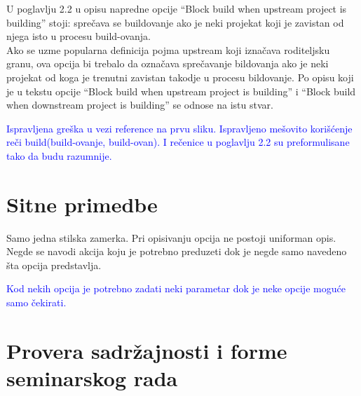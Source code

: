 \documentclass[a4paper]{report}
\newcommand{\odgovor}[1]{\textcolor{blue}{#1}}
\begin{document}
U poglavlju 2.2 u opisu napredne opcije ``Block build when upstream project is building'' stoji: sprečava se buildovanje ako je neki projekat koji je zavistan od njega isto u procesu build-ovanja. \\Ako se uzme popularna definicija pojma upstream koji iznačava roditeljsku granu, ova opcija bi trebalo da označava sprečavanje bildovanja ako je neki projekat od koga je trenutni zavistan takodje u procesu bildovanje. Po opisu koji je u tekstu opcije ``Block build when upstream project is building'' i ``Block build when downstream project is building'' se odnose na istu stvar.

\odgovor{Ispravljena greška u vezi reference na prvu sliku. Ispravljeno mešovito korišćenje reči build(build-ovanje, build-ovan). I rečenice u poglavlju 2.2 su preformulisane tako da budu razumnije.}

\section{Sitne primedbe}
Samo jedna stilska zamerka. Pri opisivanju opcija ne postoji uniforman opis. Negde se navodi akcija koju je potrebno preduzeti dok je negde samo navedeno šta opcija predstavlja.

\odgovor{Kod nekih opcija je potrebno zadati neki parametar dok je neke opcije moguće samo čekirati.}

\section{Provera sadržajnosti i forme seminarskog rada}
\end{document}

